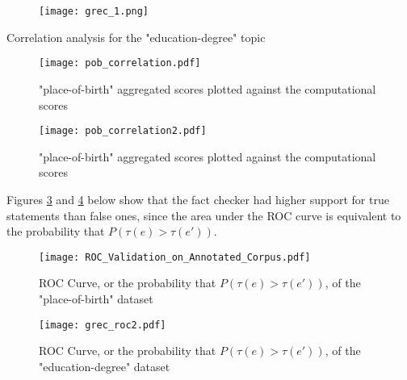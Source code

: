 \documentclass[10pt,11pt,12pt,oneside]{book}
\begin{document}
\begin{table}[H]
	\begin{figure}[H]
		\begin{center}
			\texttt{[image: grec\_1.png]}\\
		\end{center}
	\end{figure}
	\label{table_phase3_topic2}
	\caption{Correlation analysis for the "education-degree" topic}
\end{table}


\begin{figure}[H]
	\begin{center}
		\texttt{[image: pob\_correlation.pdf]}\\
		\caption{"place-of-birth" aggregated scores plotted against the computational scores}
		\label{pob_correlation_scatter}
	\end{center}
\end{figure}

\begin{figure}[H]
	\begin{center}
		\texttt{[image: pob\_correlation2.pdf]}\\
		\caption{"place-of-birth" aggregated scores plotted against the computational scores}
		\label{pob_correlation2}
	\end{center}
\end{figure}

\newpage


Figures \ref{pob_roc} and \ref{pob_roc2} below show that the fact checker had higher support for true statements than false ones, since the area under the ROC curve is equivalent to the probability that $ P (\tau (e) > \tau (e \prime)) $.\\

\begin{figure}[H]
	\begin{center}
		\texttt{[image: ROC\_Validation\_on\_Annotated\_Corpus.pdf]}\\
		\caption{ROC Curve, or the probability that $ P (\tau (e) > \tau (e \prime)) $, of the "place-of-birth" dataset}
		\label{pob_roc}
	\end{center}
\end{figure}

\begin{figure}[H]
	\begin{center}
		\texttt{[image: grec\_roc2.pdf]}\\
		\caption{ROC Curve, or the probability that $ P (\tau (e) > \tau (e \prime)) $, of the "education-degree" dataset}
		\label{pob_roc2}
	\end{center}
\end{figure}
\end{document}
